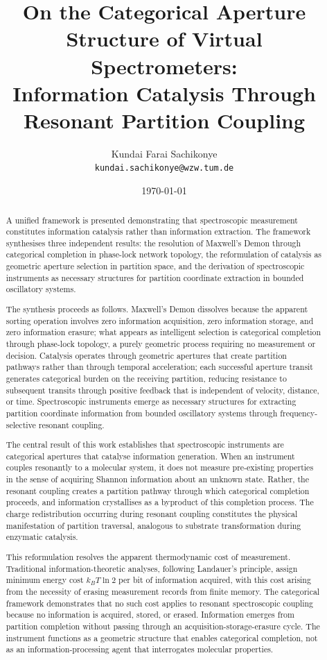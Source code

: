 \documentclass[12pt,a4paper]{article}
\title{\textbf{On the Categorical Aperture Structure of Virtual Spectrometers: \\
Information Catalysis Through Resonant Partition Coupling}}
\author{Kundai Farai Sachikonye\\
\texttt{kundai.sachikonye@wzw.tum.de}}
\date{\today}
\theoremstyle{definition}
\theoremstyle{remark}
\begin{document}
\maketitle

\begin{abstract}
A unified framework is presented demonstrating that spectroscopic measurement constitutes information catalysis rather than information extraction. The framework synthesises three independent results: the resolution of Maxwell's Demon through categorical completion in phase-lock network topology, the reformulation of catalysis as geometric aperture selection in partition space, and the derivation of spectroscopic instruments as necessary structures for partition coordinate extraction in bounded oscillatory systems.

The synthesis proceeds as follows. Maxwell's Demon dissolves because the apparent sorting operation involves zero information acquisition, zero information storage, and zero information erasure; what appears as intelligent selection is categorical completion through phase-lock topology, a purely geometric process requiring no measurement or decision. Catalysis operates through geometric apertures that create partition pathways rather than through temporal acceleration; each successful aperture transit generates categorical burden on the receiving partition, reducing resistance to subsequent transits through positive feedback that is independent of velocity, distance, or time. Spectroscopic instruments emerge as necessary structures for extracting partition coordinate information from bounded oscillatory systems through frequency-selective resonant coupling.

The central result of this work establishes that spectroscopic instruments are categorical apertures that catalyse information generation. When an instrument couples resonantly to a molecular system, it does not measure pre-existing properties in the sense of acquiring Shannon information about an unknown state. Rather, the resonant coupling creates a partition pathway through which categorical completion proceeds, and information crystallises as a byproduct of this completion process. The charge redistribution occurring during resonant coupling constitutes the physical manifestation of partition traversal, analogous to substrate transformation during enzymatic catalysis.

This reformulation resolves the apparent thermodynamic cost of measurement. Traditional information-theoretic analyses, following Landauer's principle, assign minimum energy cost $k_B T \ln 2$ per bit of information acquired, with this cost arising from the necessity of erasing measurement records from finite memory. The categorical framework demonstrates that no such cost applies to resonant spectroscopic coupling because no information is acquired, stored, or erased. Information emerges from partition completion without passing through an acquisition-storage-erasure cycle. The instrument functions as a geometric structure that enables categorical completion, not as an information-processing agent that interrogates molecular properties.


\end{abstract}
\end{document}

